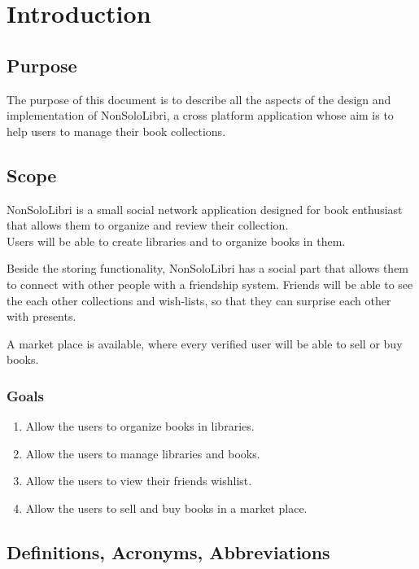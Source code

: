 \chapter{Introduction}
\section{Purpose}
The purpose of this document is to describe all the aspects of the design and implementation of NonSoloLibri, a cross platform application whose aim is to help users to manage their book collections.


\section{Scope}
NonSoloLibri is a small social network application designed for book enthusiast that allows them to organize and review their collection.\\
Users will be able to create libraries and to organize books in them.

Beside the storing functionality, NonSoloLibri has a social part that allows them to connect with other people with a friendship system.
Friends will be able to see the each other collections and wish-lists, so that they can surprise each other with presents.

A market place is available, where every verified user will be able to sell or buy books.
\subsection{Goals}

\begin{enumerate}
    \item Allow the users to organize books in libraries.
    \item Allow the users to manage libraries and books.
    \item Allow the users to view their friends wishlist.
    \item Allow the users to sell and buy books in a market place.
\end{enumerate}


\section{Definitions, Acronyms, Abbreviations}

